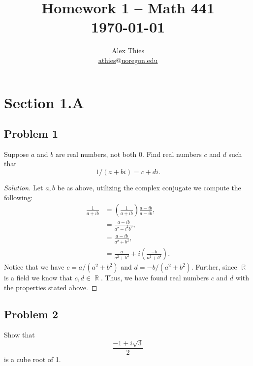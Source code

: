 \documentclass[letterpaper, 12pt]{amsart}
\DeclareMathOperator{\R}{\mathbb{R}}
\theoremstyle{definition}  %
\begin{document}
	\title{Homework 1  -- Math 441 \\ \today}
	\author{Alex Thies \\ \href{mailto:athies@uoregon.edu}{\lowercase{athies$@$uoregon.edu}}}

	\maketitle

	\section*{Section 1.A}
		\subsection*{Problem 1}
		Suppose $a$ and $b$ are real numbers, not both $0$. 
		Find real numbers $c$ and $d$ such that $$1/(a + bi) = c + di.$$

		\begin{proof}[Solution]
		Let $a,b$ be as above, utilizing the complex conjugate we compute the following:
			\begin{align*}
			\frac{1}{a + ib} &= \left( \frac{1}{a + ib} \right) \frac{a - ib}{a - ib}, \\
			&= \frac{a - ib}{a^{2} - i^{2}b^{2}}, \\
			&= \frac{a - ib}{a^{2} + b^{2}}, \\
			&= \frac{a}{a^{2} + b^{2}} + i\left( \frac{-b}{a^{2} + b^{2}} \right).
			\end{align*}
		Notice that we have $c = a/(a^{2} + b^{2})$ and $d = -b/(a^{2} + b^{2})$.
		Further, since $\R$ is a field we know that $c,d \in \R$.
		Thus, we have found real numbers $c$ and $d$ with the properties stated above.
		\end{proof}
		\newpage

		\subsection*{Problem 2}
		Show that $$\frac{-1 + i\sqrt{3}}{2}$$ is a cube root of 1.
\end{document}
